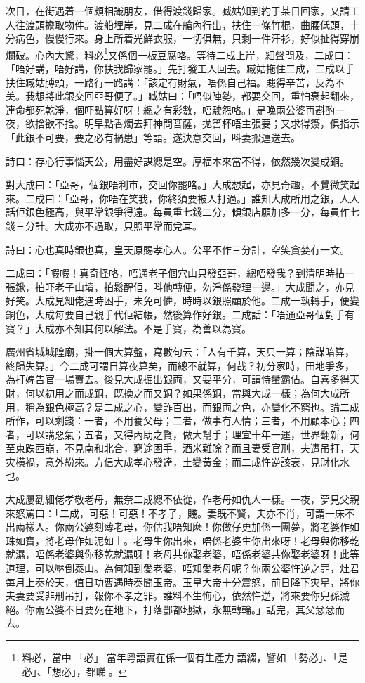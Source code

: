 \documentclass[a5paper, 12pt, openany]{book} %
\begin{document}
	次日，在街遇着一個頗相識朋友，借得渡錢歸家。臧姑知到約于某日回家，又請工人往渡頭擔取物件。渡船埋岸，見二成在艙內行出，扶住一條竹棍，曲腰低頭，十分病色，慢慢行來。身上所着光鮮衣服，一切俱無，只剩一件汗衫，好似扯得穿崩爛破。心內大驚，料必\footnote{料必，當中󱝚「必」󱪙當年粵語實在係一個有生產力󱝚語綴，譬如󱪙「勢必」、「是必」、「想必」，都睇󰧱。}又係個一板豆腐咯。等待二成上岸，細聲問及，二成曰：「唔好講，唔好講，你扶我歸家罷。」先打發工人回去。臧姑拖住二成，二成以手扶住臧姑膊頭，一路行一路講：「該定冇財氣，唔係自己福。贃得辛苦，反為不美。我想將此銀交回亞哥便了。」臧姑曰：「唔似陣勢，都要交回，重怕衰起翻來，連命都死乾淨，個吓點算好呀！總之有彩數，唔駛怨咯。」是晚兩公婆再斟酌一夜，欲捨欲不捨。明早點香燭去拜神問菩薩，拋筶杯唔主張要；又求得簽，俱指示「此銀不可要，要之必有禍患」等語。遂決意交回，呌妻搬運送去。

	詩曰：存心行事惱天公，用盡好謀總是空。厚福本來當不得，依然幾次變成銅。

	對大成曰：「亞哥，個銀唔利市，交回你罷咯。」大成想起，亦見奇趣，不覺微笑起來。二成曰：「亞哥，你唔在笑我，你終須要被人打過。」誰知大成所用之銀，人人話佢銀色極高，與平常銀爭得遠。每員重七錢二分，傾銀店願加多一分，每員作七錢三分計。大成亦不過取，只照平常而兌耳。

	詩曰：心也真時銀也真，皇天原賜孝心人。公平不作三分計，空笑貪婪冇一文。

	二成曰：「㗇㗇！真奇怪咯，唔通老子個穴山只發亞哥，總唔發我？到清明時拈一張鍬，拍吓老子山墳，拍鬆醒佢，呌他轉便，勿淨係發理一邊。」大成聞之，亦見好笑。大成見細佬遇時困手，未免可憐，時時以銀照顧於他。二成一執轉手，便變銅色，大成每要自己親手代佢結帳，然後算作好銀。二成話：「唔通亞哥個對手有寶？」大成亦不知其何以解法。不是手寶，為善以為寶。

	廣州省城城隍廟，掛一個大算盤，寫數句云：「人有千算，天只一算；陰謀暗算，終歸失算。」今二成可謂日算夜算矣，而總不就算，何哉？初分家時，田地爭多，為打婢告官一場賣去。後見大成掘出銀両，又要平分，可謂恃蠻霸佔。自喜多得天財，何以初用之而成銅，既換之而又銅？如果係銅，當與大成一樣；為何大成所用，稱為銀色極高？是二成之心，變詐百出，而銀両之色，亦變化不窮也。論二成所作，可以剩錢：一者，不用養父母；二者，做事冇人情；三者，不用顧本心；四者，可以講惡氣；五者，又得內助之賢，做大幫手；理宜十年一運，世界翻新，何至東跌西崩，不見南和北合，窮途困手，酒米難賒？而且妻受官刑，夫遭吊打，天灾橫禍，意外紛來。方信大成孝心發達，土變黃金；而二成忤逆該衰，見財化水也。

	大成屢勸細佬孝敬老母，無奈二成總不依從，作老母如仇人一樣。一夜，夢見父親來怒罵曰：「二成，可惡！可惡！不孝子，賤。妻既不賢，夫亦不肖，可謂一床不出兩樣人。你兩公婆刻薄老母，你估我唔知麽！你做仔更加係一團夢，將老婆作如珠如寶，將老母作如泥如土。老母生你出來，唔係老婆生你出來呀！老母與你移乾就濕，唔係老婆與你移乾就濕呀！老母共你娶老婆，唔係老婆共你娶老婆呀！此等道理，可以壓倒泰山。為何知到愛老婆，唔知愛老母呢？你兩公婆忤逆之罪，灶君每月上奏於天，值日功曹遇時奏聞玉帝。玉皇大帝十分震怒，前日降下灾星，將你夫妻要受非刑吊打，報你不孝之罪。誰料不生悔心，依然忤逆，將來要你兒孫滅絕。你兩公婆不日要死在地下，打落酆都地獄，永無轉輪。」話完，其父忿忿而去。
\end{document}
